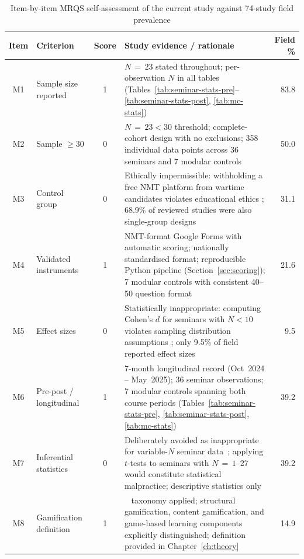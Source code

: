 \begin{table}[!h]
\centering
\caption{Item-by-item MRQS self-assessment of the current study against 74-study field prevalence}
\label{tab:mrqs-items}
\footnotesize
\begin{tabular}{clcp{6.5cm}r}
\hline
\textbf{Item} & \textbf{Criterion} & \textbf{Score} & \textbf{Study evidence / rationale} & \textbf{Field \%} \\
\hline
M1 & Sample size reported & 1 & $N\,{=}\,23$ stated throughout; per-observation $N$ in all tables (Tables~\ref{tab:seminar-stats-pre}--\ref{tab:seminar-stats-post}, \ref{tab:mc-stats}) & 83.8 \\
\hline
M2 & Sample $\geq 30$ & 0 & $N\,{=}\,23 < 30$ threshold; complete-cohort design with no exclusions; 358 individual data points across 36 seminars and 7 modular controls & 50.0 \\
\hline
M3 & Control group & 0 & Ethically impermissible: withholding a free NMT platform from wartime candidates violates educational ethics \cite{Reeves2003}; 68.9\% of reviewed studies were also single-group designs & 31.1 \\
\hline
M4 & Validated instruments & 1 & NMT-format Google Forms with automatic scoring; nationally standardised format; reproducible Python pipeline (Section~\ref{sec:scoring}); 7 modular controls with consistent 40--50 question format & 21.6 \\
\hline
M5 & Effect sizes & 0 & Statistically inappropriate: computing Cohen's $d$ for seminars with $N < 10$ violates sampling distribution assumptions \cite{Borenstein2009}; only 9.5\% of field reported effect sizes & 9.5 \\
\hline
M6 & Pre-post / longitudinal & 1 & 7-month longitudinal record (Oct~2024 -- May~2025); 36 seminar observations; 7 modular controls spanning both course periods (Tables~\ref{tab:seminar-stats-pre}, \ref{tab:seminar-stats-post}, \ref{tab:mc-stats}) & 39.2 \\
\hline
M7 & Inferential statistics & 0 & Deliberately avoided as inappropriate for variable-$N$ seminar data~\cite{creswell}; applying $t$-tests to seminars with $N\,{=}\,1$--27 would constitute statistical malpractice; descriptive statistics only & 39.2 \\
\hline
M8 & Gamification definition & 1 & \citeauthor{Deterding2011}~\cite{Deterding2011} taxonomy applied; structural gamification, content gamification, and game-based learning components explicitly distinguished; definition provided in Chapter~\ref{ch:theory} & 14.9 \\

\end{tabular}
\end{table}
